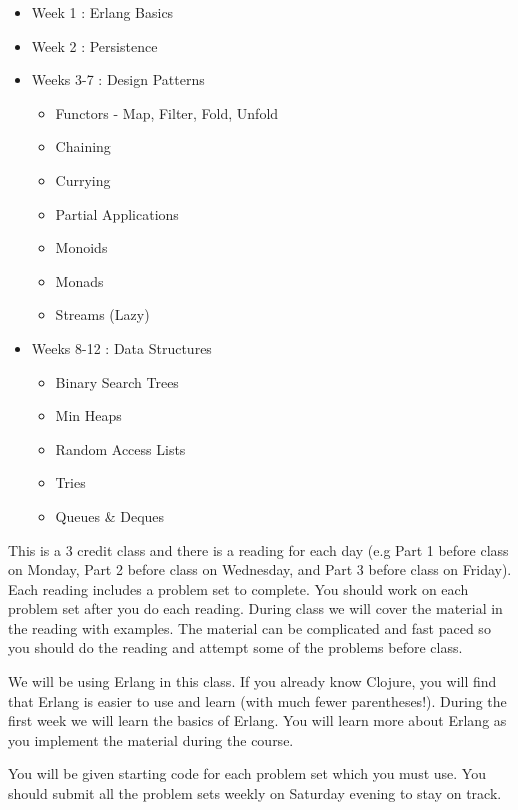\documentclass[
]{book}
\providecommand{\tightlist}{%
  \setlength{\itemsep}{0pt}\setlength{\parskip}{0pt}}
\begin{document}
\begin{itemize}
\tightlist
\item
  Week 1 : Erlang Basics
\item
  Week 2 : Persistence
\item
  Weeks 3-7 : Design Patterns

  \begin{itemize}
  \tightlist
  \item
    Functors - Map, Filter, Fold, Unfold
  \item
    Chaining
  \item
    Currying
  \item
    Partial Applications
  \item
    Monoids
  \item
    Monads
  \item
    Streams (Lazy)
  \end{itemize}
\item
  Weeks 8-12 : Data Structures

  \begin{itemize}
  \tightlist
  \item
    Binary Search Trees
  \item
    Min Heaps
  \item
    Random Access Lists
  \item
    Tries
  \item
    Queues \& Deques
  \end{itemize}
\end{itemize}

This is a 3 credit class and there is a reading for each day (e.g Part 1 before class on Monday, Part 2 before class on Wednesday, and Part 3 before class on Friday). Each reading includes a problem set to complete. You should work on each problem set after you do each reading. During class we will cover the material in the reading with examples. The material can be complicated and fast paced so you should do the reading and attempt some of the problems before class.

We will be using Erlang in this class. If you already know Clojure, you will find that Erlang is easier to use and learn (with much fewer parentheses!). During the first week we will learn the basics of Erlang. You will learn more about Erlang as you implement the material during the course.

You will be given starting code for each problem set which you must use. You should submit all the problem sets weekly on Saturday evening to stay on track.
\end{document}
